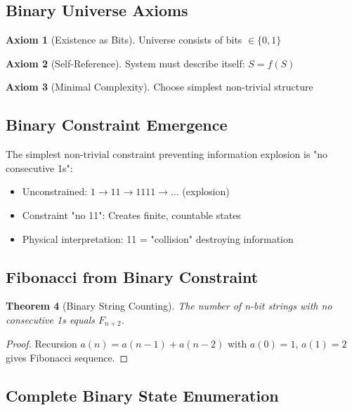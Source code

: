 \documentclass[%
 reprint,
 amsmath,amssymb,
 aps,
 prd,
 10pt,
 nofootinbib,      %
 longbibliography  %
]{revtex4-2}
\newtheorem{theorem}{Theorem}[section]
\theoremstyle{definition}
\newtheorem{axiom}[theorem]{Axiom}
\theoremstyle{remark}
\begin{document}
\subsection{Binary Universe Axioms}

\begin{axiom}[Existence as Bits]
Universe consists of bits $\in \{0,1\}$
\end{axiom}

\begin{axiom}[Self-Reference]
System must describe itself: $S = f(S)$
\end{axiom}

\begin{axiom}[Minimal Complexity]
Choose simplest non-trivial structure
\end{axiom}

\subsection{Binary Constraint Emergence}

The simplest non-trivial constraint preventing information explosion is "no consecutive 1s":
\begin{itemize}
\item Unconstrained: $1 \to 11 \to 1111 \to \ldots$ (explosion)
\item Constraint "no 11": Creates finite, countable states
\item Physical interpretation: 11 = "collision" destroying information
\end{itemize}

\subsection{Fibonacci from Binary Constraint}

\begin{theorem}[Binary String Counting]
The number of n-bit strings with no consecutive 1s equals $F_{n+2}$.
\end{theorem}

\begin{proof}
Recursion $a(n) = a(n-1) + a(n-2)$ with $a(0)=1$, $a(1)=2$ gives Fibonacci sequence.
\end{proof}

\subsection{Complete Binary State Enumeration}
\end{document}
